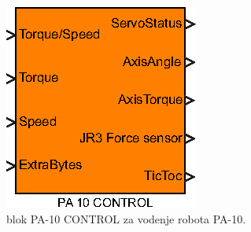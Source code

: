 \begin{figure}
	\centering
	\includegraphics[scale=1]{./Slike/simulink-pa-10.eps}
	\caption{\simulink blok PA-10 CONTROL za vodenje robota PA-10.}
	\label{fig:simulink-pa-10}
\end{figure}
